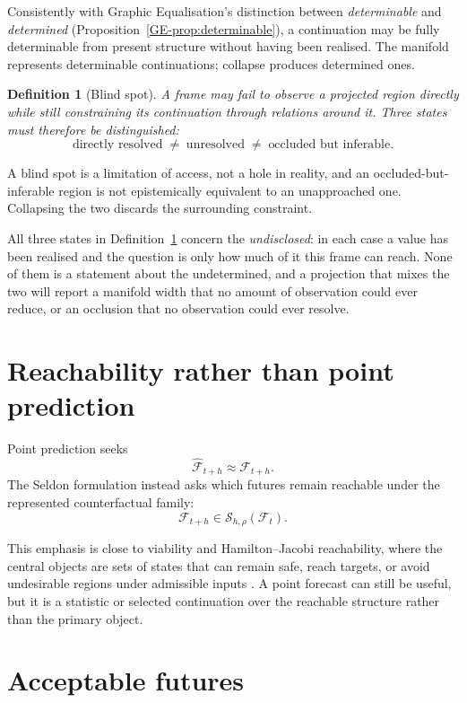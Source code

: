 \documentclass[11pt,a4paper]{article}
\newtheorem{definition}{Definition}[section]
\theoremstyle{remark}
\newcommand{\Frame}{\mathcal F}
\newcommand{\Seldon}{\mathcal S}
\begin{document}
Consistently with Graphic Equalisation's distinction between \emph{determinable} and \emph{determined} (Proposition~\ref{GE-prop:determinable}), a continuation may be fully determinable from present structure without having been realised. The manifold represents determinable continuations; collapse produces determined ones.

\begin{definition}[Blind spot]\label{def:blind-spot}
A frame may fail to observe a projected region directly while still constraining its continuation through relations around it. Three states must therefore be distinguished:
\[
\boxed{\text{directly resolved}\;\neq\;\text{unresolved}\;\neq\;\text{occluded but inferable}.}
\]
\end{definition}
A blind spot is a limitation of access, not a hole in reality, and an occluded-but-inferable region is not epistemically equivalent to an unapproached one. Collapsing the two discards the surrounding constraint.

All three states in Definition~\ref{def:blind-spot} concern the \emph{undisclosed}: in each case a value has been realised and the question is only how much of it this frame can reach. None of them is a statement about the undetermined, and a projection that mixes the two will report a manifold width that no amount of observation could ever reduce, or an occlusion that no observation could ever resolve.

\section{Reachability rather than point prediction}\label{sec:prediction}

Point prediction seeks
\[
\widehat{\Frame}_{t+h}\approx\Frame_{t+h}.
\]
The Seldon formulation instead asks which futures remain reachable under the represented counterfactual family:
\[
\Frame_{t+h}\in\Seldon_{h,\rho}(\Frame_t).
\]

This emphasis is close to viability and Hamilton--Jacobi reachability, where the central objects are sets of states that can remain safe, reach targets, or avoid undesirable regions under admissible inputs \citep{aubin1991,mitchell2005,bansal2017}. A point forecast can still be useful, but it is a statistic or selected continuation over the reachable structure rather than the primary object.

\section{Acceptable futures}\label{sec:acceptable}
\end{document}

